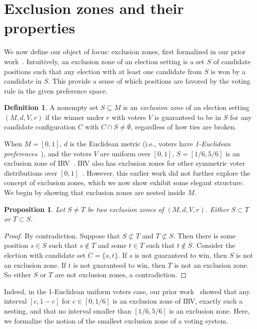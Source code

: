 \documentclass{article}
\theoremstyle{theorem}
\newtheorem{proposition}{Proposition}
\theoremstyle{definition}
\newtheorem{definition}{Definition}
\begin{document}
\section{Exclusion zones and their properties}
We now define our object of focus: exclusion zones, first formalized in our prior work~\cite{tomlinson2024moderating}. Intuitively, an exclusion zone of an election setting is a set $S$ of candidate positions such that any election with at least one candidate from $S$ is won by a candidate in $S$. This provide a sense of which positions are favored by the voting rule in the given preference space.


\begin{definition}
  A nonempty set $S\subseteq M$ is an \emph{exclusion zone} of an election setting  $(M, d, V, r)$ if the winner under $r$ with voters $V$ is guaranteed to be in $S$ for any candidate configuration $C$ with $C \cap S \ne \emptyset$, regardless of how ties are broken. 
\end{definition}

When $M = [0, 1]$, $d$ is the Euclidean metric (i.e., voters have \emph{1-Euclidean preferences}~\cite{elkind2022preference}), and the voters $V$ are uniform over $[0, 1]$,  $S = [1/6, 5/6]$ is an exclusion zone of IRV~\cite{tomlinson2024moderating}. IRV also has exclusion zones for other symmetric voter distributions over $[0, 1]$~\cite{tomlinson2024moderating}. However, this earlier work did not further explore the concept of exclusion zones, which we now show exhibit some elegant structure. We begin by showing that exclusion zones are nested inside $M$. 

\begin{proposition}\label{prop:nested}
    Let $S \ne T$ be two exclusion zones of $(M, d, V, r)$. Either $S \subset T$ or $T \subset S$. 
\end{proposition}
\begin{proof}
    By contradiction. Suppose that $S \not\subset T$ and $T \not\subset S$. Then there is some position $s \in S$ such that $s \notin T$ and some $t \in T$ such that $t \notin S$. Consider the election with candidate set $C = \{s, t\}$. If $s$ is not guaranteed to win, then $S$ is not an exclusion zone. If $t$ is not guaranteed to win, then $T$ is not an exclusion zone. So either $S$ or $T$ are not exclusion zones, a contradiction.
\end{proof}

Indeed, in the 1-Euclidean uniform voters case, our prior work~\cite{tomlinson2024moderating} showed that any interval $[c, 1-c]$ for $c \in [0, 1/6]$ is an exclusion zone of IRV, exactly such a nesting, and that no interval smaller than $[1/6, 5/6]$ is an exclusion zone. Here, we formalize the notion of the smallest exclusion zone of a voting system.
\end{document}
